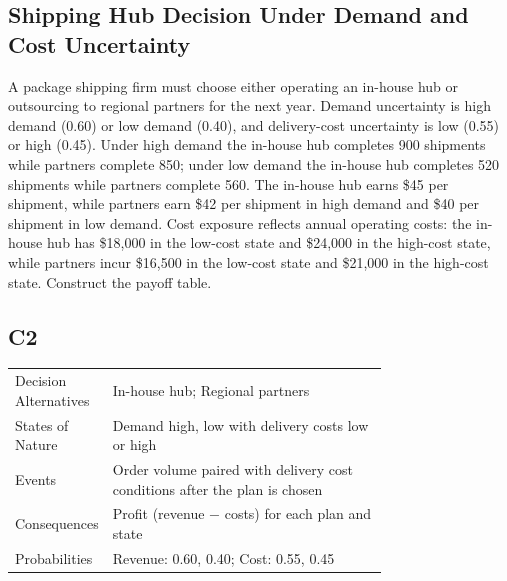 \begin{ExamProblems}
		\item
		\section{Shipping Hub Decision Under Demand and Cost Uncertainty}
		A package shipping firm must choose either operating an in-house hub or outsourcing to regional partners for the next year.
		Demand uncertainty is high demand (0.60) or low demand (0.40), and delivery-cost uncertainty is low (0.55) or high (0.45).
		Under high demand the in-house hub completes 900 shipments while partners complete 850; under low demand the in-house hub completes
		520 shipments while partners complete 560. The in-house hub earns \$45 per shipment, while partners earn \$42 per shipment in high demand
		and \$40 per shipment in low demand. Cost exposure reflects annual operating costs: the in-house hub has \$18{,}000 in the low-cost state
		and \$24{,}000 in the high-cost state, while partners incur \$16{,}500 in the low-cost state and \$21{,}000 in the high-cost state.
		Construct the payoff table.
		
		\subsection*{C2}
		\begin{center}
			\begin{tabular}{l p{0.74\linewidth}}
				\toprule
				Decision Alternatives & In-house hub; Regional partners \\
				States of Nature & Demand high, low with delivery costs low or high \\
				Events & Order volume paired with delivery cost conditions after the plan is chosen \\
				Consequences & Profit (revenue $-$ costs) for each plan and state \\
				Probabilities & Revenue: 0.60, 0.40; Cost: 0.55, 0.45 \\
				\bottomrule
			\end{tabular}
		\end{center}

\end{ExamProblems}
